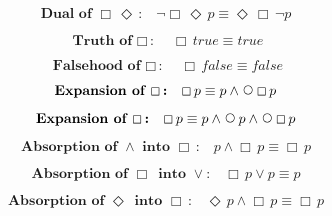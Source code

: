\documentclass[12pt, fleqn, leqno]{article}
\newcommand{\Next}{\;\,\text{\raisebox{3.5pt}{\circle{6}}}}
\newcommand{\Event}{\Diamond\,}
\newcommand{\Always}{\Box\,}
\newcommand{\spacer}{\vspace{-30pt}}
\begin{document}
\begin{equation}\label{E:dualAlwaysEvent}
\textbf{Dual of $\Always \Event$:}\quad \neg \Always\Event p \equiv \Event \Always\neg p
\end{equation}

\spacer

\begin{equation}\label{E:alwaysTrue}
\textbf{Truth of $\Always$:}\quad \Always true \equiv true
\end{equation}

\spacer

\begin{equation}\label{E:alwaysFalse}
\textbf{Falsehood of $\Always$:}\quad \Always false \equiv false
\end{equation}

\spacer

\begin{equation}\label{E:expansionAlways}
\textbf{Expansion of $\Always$:}\quad \Always p \equiv p \land \Next\Always p
\end{equation}

\spacer

\begin{equation}\label{E:expansionAlways2}
\textbf{Expansion of $\Always$:}\quad \Always p \equiv p \land \Next p \land \Next\Always p
\end{equation}

\spacer

\begin{equation}\label{E:absAndIntoAlways}
\textbf{Absorption of $\land$ into $\Always$:}\quad p \land \Always p \equiv \Always p
\end{equation}

\spacer

\begin{equation}\label{E:absAlwaysIntoOr}
\textbf{Absorption of $\Always$ into $\lor$:}\quad \Always p \lor p \equiv p
\end{equation}

\spacer

\begin{equation}\label{E:absEventIntoAlways}
\textbf{Absorption of $\Event$ into $\Always$:}\quad \Event p \land \Always p \equiv \Always p
\end{equation}
\end{document}
